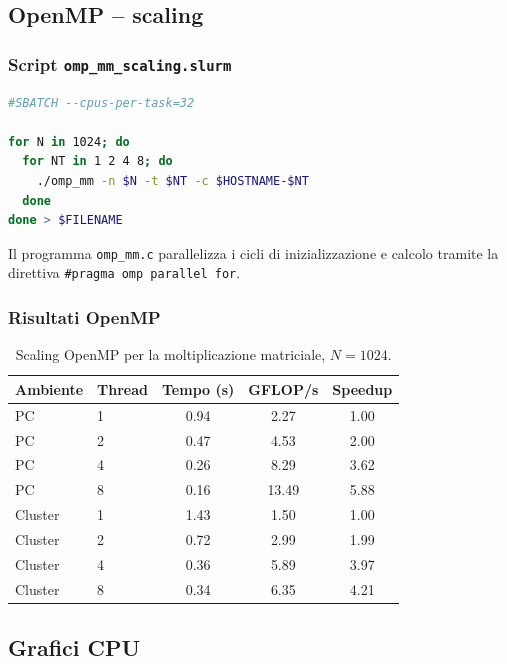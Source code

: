 \documentclass[a4paper,12pt]{article}
\begin{document}
\subsection{OpenMP -- scaling}

\subsubsection{Script \texttt{omp\_mm\_scaling.slurm}}

\begin{lstlisting}[language=bash]
#SBATCH --cpus-per-task=32

for N in 1024; do
  for NT in 1 2 4 8; do
    ./omp_mm -n $N -t $NT -c $HOSTNAME-$NT
  done
done > $FILENAME
\end{lstlisting}

Il programma \texttt{omp\_mm.c} parallelizza i cicli di inizializzazione e calcolo tramite la direttiva \texttt{\#pragma omp parallel for}.

\subsubsection{Risultati OpenMP}

\begin{table}[H]
\centering
\begin{tabular}{llccc}
\toprule
\textbf{Ambiente} & \textbf{Thread} & \textbf{Tempo (s)} & \textbf{GFLOP/s} & \textbf{Speedup} \\
\midrule
PC      & 1 & 0.94 & 2.27  & 1.00 \\
PC      & 2 & 0.47 & 4.53  & 2.00 \\
PC      & 4 & 0.26 & 8.29  & 3.62 \\
PC      & 8 & 0.16 & 13.49 & 5.88 \\
\midrule
Cluster & 1 & 1.43 & 1.50  & 1.00 \\
Cluster & 2 & 0.72 & 2.99  & 1.99 \\
Cluster & 4 & 0.36 & 5.89  & 3.97 \\
Cluster & 8 & 0.34 & 6.35  & 4.21 \\
\bottomrule
\end{tabular}
\caption{Scaling OpenMP per la moltiplicazione matriciale, $N=1024$.}
\end{table}

\subsection{Grafici CPU}
\end{document}
